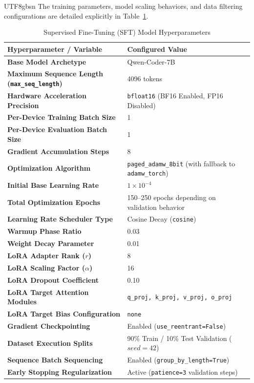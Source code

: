 \documentclass{article}
\begin{document}
\begin{CJK*}{UTF8}{gbsn}
The training parameters, model scaling behaviors, and data filtering configurations are detailed explicitly in Table~\ref{tab:sft_hyperparameters}.

\begin{table}[h]
  \caption{Supervised Fine-Tuning (SFT) Model Hyperparameters}
  \label{tab:sft_hyperparameters}
  \centering
  \begin{tabular}{ll}
    \toprule
    Hyperparameter / Variable & Configured Value \\
    \midrule
    \textbf{Base Model Archetype} & Qwen-Coder-7B \\
    \textbf{Maximum Sequence Length (\texttt{max\_seq\_length})} & 4096 tokens \\
    \textbf{Hardware Acceleration Precision} & \texttt{bfloat16} (BF16 Enabled, FP16 Disabled) \\
    \textbf{Per-Device Training Batch Size} & 1 \\
    \textbf{Per-Device Evaluation Batch Size} & 1 \\
    \textbf{Gradient Accumulation Steps} & 8 \\
    \textbf{Optimization Algorithm} & \texttt{paged\_adamw\_8bit} (with fallback to \texttt{adamw\_torch}) \\
    \textbf{Initial Base Learning Rate} & $1 \times 10^{-4}$ \\
    \textbf{Total Optimization Epochs} & 150--250 epochs depending on validation behavior \\
    \textbf{Learning Rate Scheduler Type} & Cosine Decay (\texttt{cosine}) \\
    \textbf{Warmup Phase Ratio} & 0.03 \\
    \textbf{Weight Decay Parameter} & 0.01 \\
    \midrule
    \textbf{LoRA Adapter Rank ($r$)} & 8 \\
    \textbf{LoRA Scaling Factor ($\alpha$)} & 16 \\
    \textbf{LoRA Dropout Coefficient} & 0.10 \\
    \textbf{LoRA Target Attention Modules} & \texttt{q\_proj, k\_proj, v\_proj, o\_proj} \\
    \textbf{LoRA Target Bias Configuration} & \texttt{none} \\
    \midrule
    \textbf{Gradient Checkpointing} & Enabled (\texttt{use\_reentrant=False}) \\
    \textbf{Dataset Execution Splits} & 90\% Train / 10\% Test Validation ($seed=42$) \\
    \textbf{Sequence Batch Sequencing} & Enabled (\texttt{group\_by\_length=True}) \\
    \textbf{Early Stopping Regularization} & Active (\texttt{patience=3} validation steps) \\
    \bottomrule
  \end{tabular}
\end{table}


\end{CJK*}
\end{document}
